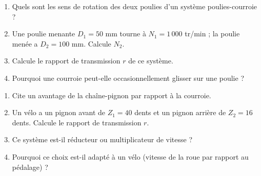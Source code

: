 \begin{enumerate}[label=\arabic*)]
\item Quels sont les sens de rotation des deux poulies d'un système poulies-courroie ?
\item Une poulie menante $D_1=50$ mm tourne à $N_1=1\,000$ tr/min ; la poulie menée a
$D_2=100$ mm. Calcule $N_2$.
\item Calcule le rapport de transmission $r$ de ce système.
\item Pourquoi une courroie peut-elle occasionnellement glisser sur une poulie ?
\end{enumerate}

\begin{enumerate}[label=\arabic*)]
\item Cite un avantage de la chaîne-pignon par rapport à la courroie.
\item Un vélo a un pignon avant de $Z_1=40$ dents et un pignon arrière de $Z_2=16$
dents. Calcule le rapport de transmission $r$.
\item Ce système est-il réducteur ou multiplicateur de vitesse ?
\item Pourquoi ce choix est-il adapté à un vélo (vitesse de la roue par rapport au
pédalage) ?
\end{enumerate}

